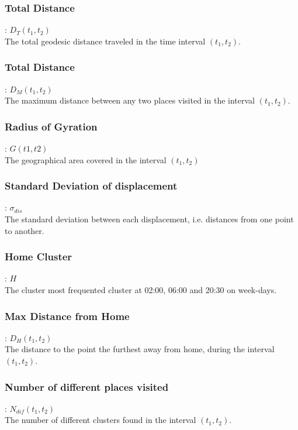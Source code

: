 \subsubsection*{Total Distance}: $D_T (t_1, t_2)$ \\
The total geodesic distance traveled in the time interval $(t_1, t_2)$.\\

\subsubsection*{Total Distance}: $D_M (t_1, t_2)$ \\
The maximum distance between any two places visited in the interval $(t_1, t_2)$.\\

\subsubsection*{Radius of Gyration}: $G(t1, t2)$\\
The geographical area covered in the interval $(t_1, t_2)$

\subsubsection*{Standard Deviation of displacement}:  $\sigma_{dis}$\\
The standard deviation between each displacement, i.e. distances from one point to another.

\subsubsection*{Home Cluster}: $H$\\
The cluster most frequented cluster at 02:00, 06:00 and 20:30 on week-days.

\subsubsection*{Max Distance from Home}: $D_H(t_1, t_2)$\\
The distance to the point the furthest away from home, during the interval $(t_1, t_2)$.\\

\subsubsection*{Number of different places visited}: $N_{dif} (t_1, t_2)$\\
The number of different clusters found in the interval $(t_1, t_2)$.\\


